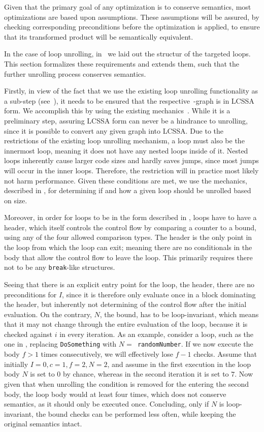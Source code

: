 Given that the primary goal of any optimization is to conserve semantics, most optimizations are based upon assumptions.
These assumptions will be assured, by checking corresponding preconditions before the optimization is applied, to ensure that its transformed product will be semantically equivalent.

In the case of loop unrolling, in~ we laid out the structur of the targeted loops.
This section formalizes these requirements and extends them, such that the further unrolling process conserves semantics.

Firstly, in view of the fact that we use the existing loop unrolling functionality as a sub-step (see~), it needs to be ensured that the respective~\libFIRM-graph is in LCSSA form.
We accomplish this by using the existing mechanics~\cite{aebi18bachelorarbeit}.
While it is a preliminary step, assuring LCSSA form can never be a hindrance to unrolling, since it is possible to convert any given graph into LCSSA.
Due to the restrictions of the existing loop unrolling mechanism, a loop must also be the innermost loop, meaning it does not have any nested loops inside of it.
Nested loops inherently cause larger code sizes and hardly saves jumps, since most jumps will occur in the inner loops.
Therefore, the restriction will in practice most likely not harm performance.
Given these conditions are met, we use the mechanics, described in , for determining if and how a given loop should be unrolled based on size.

Moreover, in order for loops to be in the form described in , loops have to have a header, which itself controls the control flow by comparing a counter to a bound, using any of the four allowed comparison types.
The header is the only point in the loop from which the loop can exit; meaning there are no conditionals in the body that allow the control flow to leave the loop.
This primarily requires there not to be any \texttt{break}-like structures.

Seeing that there is an explicit entry point for the loop, the header, there are no preconditions for $I$, since it is therefore only evaluate once in a block dominating the header, but inherently not determining of the control flow after the initial evaluation.
On the contrary, $N$, the bound, has to be loop-invariant, which means that it may not change through the entire evaluation of the loop, because it is checked against $i$ in every iteration.
As an example, consider a loop, such as the one in , replacing \texttt{DoSomething} with \texttt{$N =$ randomNumber}.
If we now execute the body $f > 1$ times consecutively, we will effectively lose $f - 1$ checks.
Assume that initially $I = 0, c = 1, f = 2, N = 2$, and assume in the first execution in the loop body $N$ is set to $0$ by chance, whereas in the second iteration it is set to $7$.
Now given that when unrolling the condition is removed for the entering the second body, the loop body would at least four times, which does not conserve semantics, as it should only be executed once.
Concluding, only if $N$ is loop-invariant, the bound checks can be performed less often, while keeping the original semantics intact.

